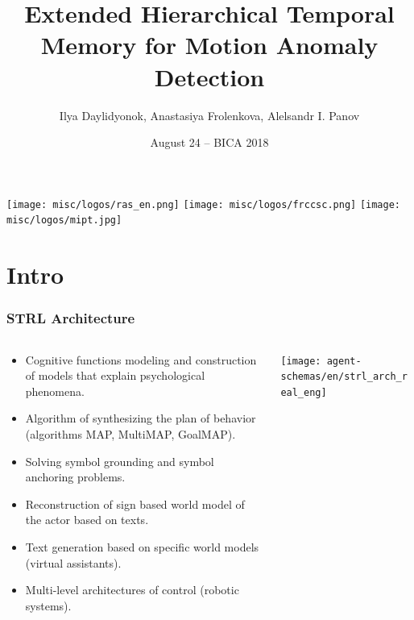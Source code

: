 \documentclass[default]{beamer}
\begin{document}
	
	\title[HTM$\rightarrow$HCN+Anomaly Detection]{Extended Hierarchical Temporal Memory for Motion Anomaly Detection}
	\author[Daylidyonok, Frolenkova, Panov]{Ilya Daylidyonok, Anastasiya Frolenkova, Alelsandr I. Panov}
	\date[August 24 -- BICA 2018]{August 24 -- BICA 2018} 
		
	\begin{frame}
		\titlepage
		\centering
		\texttt{[image: misc/logos/ras\_en.png]} \hspace{10pt}
		\texttt{[image: misc/logos/frccsc.png]} \hspace{10pt}
		\texttt{[image: misc/logos/mipt.jpg]}
	\end{frame}

	\section{Intro}

	\begin{frame}
		\frametitle{STRL Architecture}
		
		\footnotesize
		\begin{columns}
			\begin{column}{0.43\textwidth}
				\begin{itemize}
					\item Cognitive functions modeling and construction of models that explain psychological phenomena.
					\item Algorithm of synthesizing the plan of behavior (algorithms MAP, MultiMAP, GoalMAP).
					\item Solving symbol grounding and symbol anchoring problems.
					\item Reconstruction of sign based world model of the actor based on texts.
					\item Text generation based on specific world models (virtual assistants).
					\item Multi-level architectures of control (robotic systems).
				\end{itemize}
				
			\end{column}
			\begin{column}{0.57\textwidth}
				\texttt{[image: agent-schemas/en/strl\_arch\_real\_eng]}
			\end{column}
		\end{columns}
		\vspace{-5pt}
		\nocite{*}
		\printbibliography[keyword={strl}, resetnumbers=true]
	\end{frame}
\end{document}
